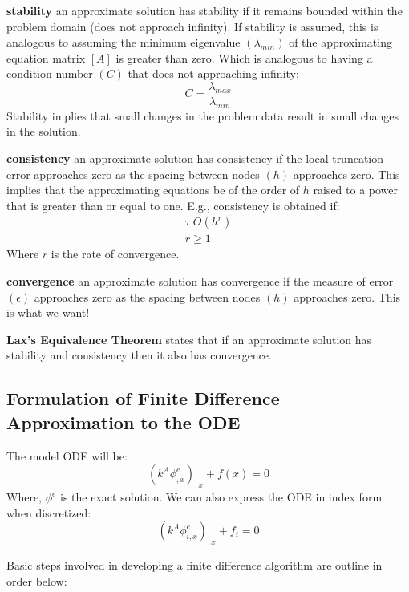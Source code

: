\documentclass[letterpaper, 10pt, oneside]{article}
\newenvironment{dd}[1]{
	\noindent
	\textbf{\normalsize{#1}}
	\hspace{0.1in}
	\small
	\rmfamily
	}
	{\medskip}
\newcommand{\be}{\begin{equation}}
\newcommand{\ee}{\end{equation}}
\newcommand{\as}[1]{\begin{align*}#1\end{align*}}
\newcommand{\bdd}{\begin{dd}}
\newcommand{\edd}{\end{dd}}
\begin{document}
\bdd{stability} an approximate solution has stability if it remains bounded within the problem domain (does not approach infinity).  If stability is assumed, this is analogous to assuming the minimum eigenvalue $(\lambda_{min})$ of the approximating equation matrix $[A]$ is greater than zero.  Which is analogous to having a condition number $(C)$ that does not approaching infinity:
$$C = \frac{\lambda_{max}}{\lambda_{min}}$$
Stability implies that small changes in the problem data result in small changes in the solution.
\edd

\bdd{consistency} an approximate solution has consistency if the local truncation error approaches zero as the spacing between nodes $(h)$ approaches zero.  This implies that the approximating equations be of the order of $h$ raised to a power that is greater than or equal to one.  E.g., consistency is obtained if:
\as{
	\tau \; O (h^r) \\
	r \ge 1}
Where $r$ is the rate of convergence.
\edd

\bdd{convergence} an approximate solution has convergence if the measure of error $(\epsilon)$ approaches zero as the spacing between nodes $(h)$ approaches zero.  This is what we want!
\edd

\bdd{Lax's Equivalence Theorem} states that if an approximate solution has stability and consistency then it also has convergence.
\edd

\subsection{Formulation of Finite Difference Approximation to the ODE}

The model ODE will be: 
\be (k^A\phi_{,x}^e)_{,x} +f(x)=0 \ee
Where, $\phi^e$ is the exact solution.  We can also express the ODE in index form when discretized:
\be (k^A\phi_{i,x}^e)_{,x} +f_i=0 \label{disc_ode} \ee

 Basic steps involved in developing a finite difference algorithm are outline in order below:
\end{document}
